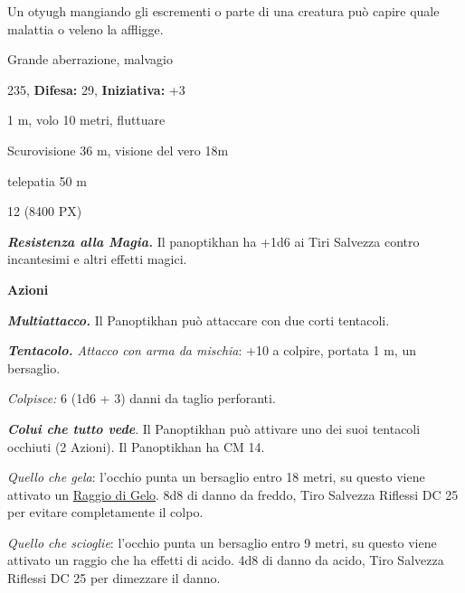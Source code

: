 \begin{multicols}{2}
{Un otyugh mangiando gli escrementi o parte di una creatura può capire quale malattia o veleno la affligge.


\noindent
\begin{description}[noitemsep, topsep=0pt, parsep=0pt, partopsep=0pt, leftmargin=0cm, labelwidth=2.2cm]
	\item[\textbf{Taglia/Tipo:}] Grande aberrazione, malvagio
	\item[\textbf{Caratt.:}] 
	\item[\textbf{Punti Ferita:}] 235,  \textbf{Difesa:} 29,  \textbf{Iniziativa:} +3
	\item[\textbf{Movimento:}] 1 m, volo 10 metri, fluttuare
	\item[\textbf{Tiri Salvez.:}] 
	\item[\textbf{Sensi:}] Scurovisione 36 m, visione del vero 18m
	\item[\textbf{Linguaggi:}] telepatia 50 m
	\item[\textbf{Sfida:}] 12 (8400 PX)\smallskip
\end{description}

\emph{\textbf{Resistenza alla Magia.}} Il panoptikhan ha +1d6 ai Tiri Salvezza contro incantesimi e altri effetti magici.

\textbf{Azioni}

\emph{\textbf{Multiattacco.}} Il Panoptikhan può attaccare con due corti tentacoli.

\emph{\textbf{Tentacolo.} Attacco con arma da mischia}: +10 a colpire, portata 1 m, un bersaglio.

\emph{Colpisce:} 6 (1d6 + 3) danni da taglio perforanti.

\emph{\textbf{Colui che tutto vede}}. Il Panoptikhan può attivare uno dei suoi tentacoli occhiuti (2 Azioni). Il Panoptikhan ha CM 14.

\emph{Quello che gela}: l'occhio punta un bersaglio entro 18 metri, su questo viene attivato un \hyperlink{Raggio di Gelo}{Raggio di Gelo}. 8d8 di danno da freddo, Tiro Salvezza Riflessi DC 25 per evitare completamente il colpo.

\emph{Quello che scioglie}: l'occhio punta un bersaglio entro 9 metri, su questo viene attivato un raggio che ha effetti di acido. 4d8 di danno da acido, Tiro Salvezza Riflessi DC 25 per dimezzare il danno.

}
\end{multicols}
